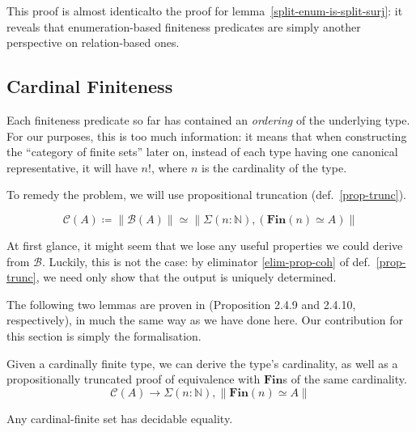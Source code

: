 This proof is almost identical\footnotemark to the proof for
lemma~\ref{split-enum-is-split-surj}: it reveals that
enumeration-based finiteness predicates are simply another perspective on
relation-based ones.
\subsection{Cardinal Finiteness}
Each finiteness predicate so far has contained an \emph{ordering} of the
underlying type.
For our purposes, this is too much information: it means that when constructing
the ``category of finite sets'' later on, instead of each type having one
canonical representative, it will have \(n!\), where \(n\) is the cardinality of
the type\footnotemark.


To remedy the problem, we will use propositional truncation
(def.~\ref{prop-trunc}).
\begin{definition}
  \begin{equation}
    \mathcal{C}(A) \coloneqq \lVert \mathcal{B}(A) \rVert \simeq \lVert \Sigma(n : \mathbb{N}) , (\mathbf{Fin}(n) \simeq A) \rVert
  \end{equation}
\end{definition}
At first glance, it might seem that we lose any useful properties we could
derive from \(\mathcal{B}\).
Luckily, this is not the case: by eliminator \ref{elim-prop-coh} of
def.~\ref{prop-trunc}, we need only show that the output is uniquely determined.

The following two lemmas are proven in
\cite{yorgeyCombinatorialSpeciesLabelled2014} (Proposition 2.4.9 and 2.4.10,
respectively), in much the same way as we have done here.
Our contribution for this section is simply the formalisation.
\begin{lemma}
  Given a cardinally finite type, we can derive the type's cardinality, as well
  as a propositionally truncated proof of equivalence with \(\textbf{Fin}\)s of
  the same cardinality.
  \begin{equation}
    \mathcal{C}(A) \rightarrow \Sigma {(n : \mathbb{N})} , \lVert \textbf{Fin}(n) \simeq A \rVert
  \end{equation}
\end{lemma}
\begin{lemma} \label{cardinal-finite-discrete}
  Any cardinal-finite set has decidable equality.
\end{lemma}
